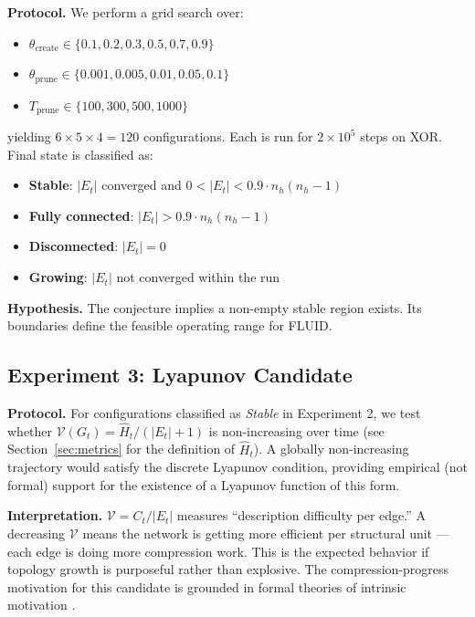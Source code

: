 \documentclass[12pt]{article}
\begin{document}
\textbf{Protocol.} We perform a grid search over:
\begin{itemize}
    \item $\theta_{\text{create}} \in \{0.1, 0.2, 0.3, 0.5, 0.7, 0.9\}$
    \item $\theta_{\text{prune}} \in \{0.001, 0.005, 0.01, 0.05, 0.1\}$
    \item $T_{\text{prune}} \in \{100, 300, 500, 1000\}$
\end{itemize}
yielding $6 \times 5 \times 4 = 120$ configurations. Each is run for $2 \times 10^5$ steps on XOR. Final state is classified as:
\begin{itemize}
    \item \textbf{Stable}: $|E_t|$ converged and $0 < |E_t| < 0.9 \cdot n_h(n_h-1)$
    \item \textbf{Fully connected}: $|E_t| > 0.9 \cdot n_h(n_h-1)$
    \item \textbf{Disconnected}: $|E_t| = 0$
    \item \textbf{Growing}: $|E_t|$ not converged within the run
\end{itemize}

\textbf{Hypothesis.} The conjecture implies a non-empty stable region exists. Its boundaries define the feasible operating range for FLUID.

\subsection{Experiment 3: Lyapunov Candidate}

\textbf{Protocol.} For configurations classified as \textit{Stable} in Experiment 2, we test whether $\mathcal{V}(G_t) = \hat{H}_t / (|E_t| + 1)$ is non-increasing over time (see Section~\ref{sec:metrics} for the definition of $\hat{H}_t$). A globally non-increasing trajectory would satisfy the discrete Lyapunov condition, providing empirical (not formal) support for the existence of a Lyapunov function of this form.

\textbf{Interpretation.} $\mathcal{V} = C_t / |E_t|$ measures ``description difficulty per edge.'' A decreasing $\mathcal{V}$ means the network is getting more efficient per structural unit --- each edge is doing more compression work. This is the expected behavior if topology growth is purposeful rather than explosive. The compression-progress motivation for this candidate is grounded in formal theories of intrinsic motivation \cite{schmidhuber2010}.

\end{document}
